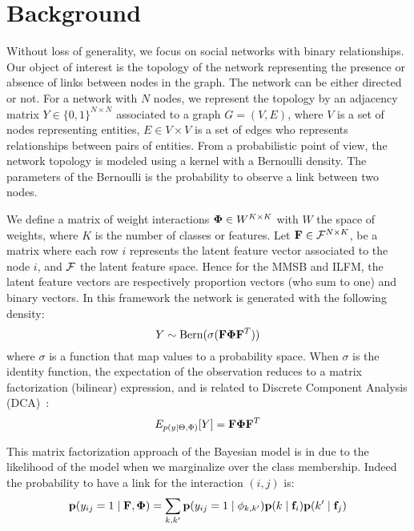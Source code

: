 \section{Background}
\label{sec:background}
Without loss of generality, we focus on social networks with binary relationships. Our object of interest is the topology of the network representing the presence or absence of links between nodes in the graph. The network can be either directed or not. For a network with $N$ nodes, we represent the topology by an adjacency matrix $Y \in \{0,1\}^{N\times N}$ associated to a graph $G = (V,E)$, where $V$ is a set of nodes representing entities, $E \in V \times V$ is a set of edges who represents relationships between pairs of entities. From a probabilistic point of view, the network topology is modeled using a kernel with a Bernoulli density. The parameters of the Bernoulli is the probability to observe a link between two nodes.

We define a matrix of weight interactions $\mathbf{\Phi} \in W^{K\times K}$ with $W$ the space of weights, where $K$ is the number of classes or features. Let $\mathbf{F} \in \mathcal{F}^{N\times K}$, be a matrix where each row $i$ represents the latent feature vector associated to the node $i$,  and $\cal{F}$ the latent feature space. Hence for the MMSB and ILFM, the latent feature vectors are respectively proportion vectors (who sum to one) and binary vectors. In this framework the network is generated with the following density:
\begin{equation} \label{MFDCA}
    Y \sim \mathrm{Bern}(\sigma(\mat{F} \mat{\Phi}  \mat{F}^T))
\end{equation}
where $\sigma$ is a function that map values to a probability space. When $\sigma$ is the identity function, the expectation of the observation reduces to a matrix factorization (bilinear) expression, and is related to Discrete Component Analysis (DCA)~\cite{DCA}:
\begin{equation}
E_{p(y|\Theta, \Phi)}[Y] = \mathbf{F} \mathbf{\Phi}  \mathbf{F}^T
\end{equation}

This matrix factorization approach of the Bayesian model is in due to the likelihood of the model when we marginalize over the class membership. Indeed the probability to have a link for the interaction $(i,j)$ is:
\begin{equation} \label{eq:mf}
\pr(y_{ij}=1 \mid \mat{F}, \mat{\Phi } ) = \sum_{k, k'} \pr(y_{ij}=1\mid\phi_{k,k'}) \pr(k \mid \mat{f}_i) \pr(k' \mid \mat{f}_j)
\end{equation}


